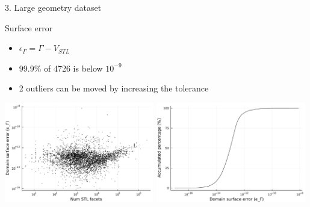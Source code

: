 \documentclass{beamer}
\begin{document}
\begin{frame}{3. Large geometry dataset}

  \begin{block}{Surface error}
  \begin{itemize}
    \item
      $\epsilon_\Gamma = \Gamma - V_{STL}$
    \item
      99.9\% of 4726 is below $10^{-9}$
    \item
      2 outliers can be moved by increasing the tolerance
  \end{itemize}
  \end{block}

  \includegraphics[width=0.49\textwidth]{../analysis/plots/num_stl_facets_surface_error}
  \includegraphics[width=0.49\textwidth]{../analysis/plots/histogram_surface_error}
\end{frame}
\end{document}
